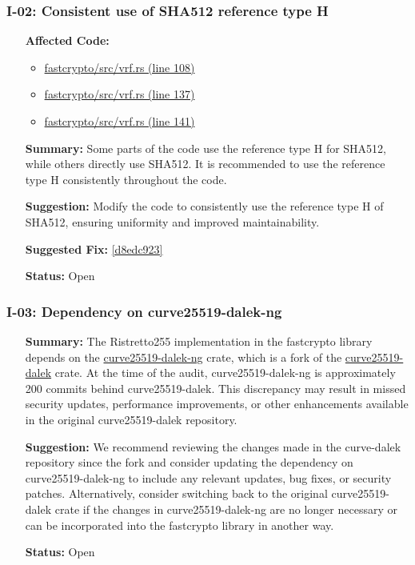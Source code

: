 \subsubsection*{I-02: Consistent use of SHA512 reference type H}
\begin{itemize}[align=left]
\item[\textbf{Affected Code:}]\
\begin{itemize}
\item \href{https://github.com/MystenLabs/fastcrypto/blob/963205c6d0538fe548b8b10037cf87a53af6f424/fastcrypto/src/vrf.rs#L108}{fastcrypto/src/vrf.rs (line 108)}
\item \href{https://github.com/MystenLabs/fastcrypto/blob/963205c6d0538fe548b8b10037cf87a53af6f424/fastcrypto/src/vrf.rs#L137}{fastcrypto/src/vrf.rs (line 137)}
\item \href{https://github.com/MystenLabs/fastcrypto/blob/963205c6d0538fe548b8b10037cf87a53af6f424/fastcrypto/src/vrf.rs#L141}{fastcrypto/src/vrf.rs (line 141)}
\end{itemize}
\item[\textbf{Summary:}] Some parts of the code use the reference type H for SHA512, while others directly use SHA512. It is recommended to use the reference type H consistently throughout the code.
\item[\textbf{Suggestion:}] Modify the code to consistently use the reference type H of SHA512, ensuring uniformity and improved maintainability.
\item[\textbf{Suggested Fix:}] \href{https://github.com/MystenLabs/fastcrypto/pull/543/commits/d8edc92340dd957f4bd05c356379be7ffa0916a5}{[d8edc923]}
\item[\textbf{Status:}] Open
\end{itemize}

\subsubsection*{I-03: Dependency on curve25519-dalek-ng}
\begin{itemize}[align=left]
    \item[\textbf{Summary:}] The Ristretto255 implementation in the fastcrypto library depends on the \href{https://github.com/zkcrypto/curve25519-dalek-ng}{curve25519-dalek-ng} crate, which is a fork of the \href{https://github.com/dalek-cryptography/curve25519-dalek}{curve25519-dalek} crate. At the time of the audit, curve25519-dalek-ng is approximately 200 commits behind curve25519-dalek. This discrepancy may result in missed security updates, performance improvements, or other enhancements available in the original curve25519-dalek repository.
    \item[\textbf{Suggestion:}] We recommend reviewing the changes made in the curve\-25519-dalek repository since the fork and consider updating the dependency on curve25519-dalek-ng to include any relevant updates, bug fixes, or security patches. Alternatively, consider switching back to the original curve25519-dalek crate if the changes in curve25519-dalek-ng are no longer necessary or can be incorporated into the fastcrypto library in another way.
    \item[\textbf{Status:}] Open
\end{itemize}


